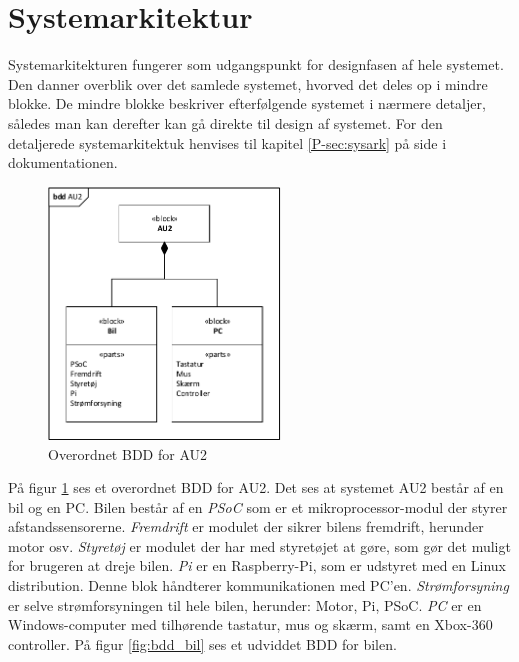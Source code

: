 \section{Systemarkitektur} \label{ch:Systemarkitektur}

Systemarkitekturen fungerer som udgangspunkt for designfasen af hele systemet.
Den danner overblik over det samlede systemet, hvorved det deles op i mindre blokke. 
De mindre blokke beskriver efterfølgende systemet i nærmere detaljer, således man kan derefter kan gå direkte til design af systemet. For den detaljerede systemarkitektuk henvises til kapitel \ref{P-sec:sysark}  på side \pageref{P-sec:sysark} i dokumentationen.

\begin{figure}[h]
\centering
\includegraphics[width=0.55\textwidth]{../fig/diagrammer/bdd_au2.pdf}
\caption{Overordnet BDD for AU2}
\label{fig:bdd_au2}
\end{figure}

På figur \ref{fig:bdd_au2} ses et overordnet BDD for AU2. 
Det ses at systemet AU2 består af en bil og en PC. 
Bilen består af en \emph{PSoC} som er et mikroprocessor-modul der styrer afstandssensorerne. 
\emph{Fremdrift} er modulet der sikrer bilens fremdrift, herunder motor osv. 
\emph{Styretøj} er modulet der har med styretøjet at gøre, som gør det muligt for brugeren at dreje bilen. 
\emph{Pi} er en Raspberry-Pi, som er udstyret med en Linux distribution.
Denne blok håndterer kommunikationen med PC'en. 
\emph{Strømforsyning} er selve strømforsyningen til hele bilen, herunder: Motor, Pi, PSoC. 
\emph{PC} er en Windows-computer med tilhørende tastatur, mus og skærm, samt en Xbox-360 controller. 
På figur \ref{fig:bdd_bil} ses et udviddet BDD for bilen.  

\clearpage

